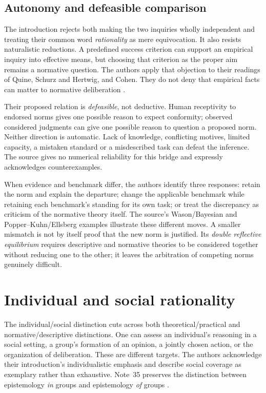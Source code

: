 \subsection{Autonomy and defeasible comparison}

The introduction rejects both making the two inquiries wholly
independent and treating their common word \emph{rationality} as
mere equivocation. It also resists naturalistic reductions. A predefined
success criterion can support an empirical inquiry into effective
means, but choosing that criterion as the proper aim remains a
normative question. The authors apply that objection to their readings
of Quine, Schurz and Hertwig, and Cohen. They do not deny that
empirical facts can matter to normative deliberation
\cite[pp.~24--26 and notes~28--33]{KnauffSpohn2021FrameworksIntro}.

Their proposed relation is \emph{defeasible}, not deductive. Human
receptivity to endorsed norms gives one possible reason to expect
conformity; observed considered judgments can give one possible reason
to question a proposed norm. Neither direction is automatic. Lack of
knowledge, conflicting motives, limited capacity, a mistaken standard
or a misdescribed task can defeat the inference. The source gives no
numerical reliability for this bridge and expressly acknowledges
counterexamples.

When evidence and benchmark differ, the authors identify three responses:
retain the norm and explain the departure; change the applicable
benchmark while retaining each benchmark's standing for its own task;
or treat the discrepancy as criticism of the normative theory itself.
The source's Wason/Bayesian and Popper--Kuhn/Ellsberg examples illustrate
these different moves. A smaller mismatch is not by itself proof that
the new norm is justified. Its \emph{double reflective equilibrium}
requires descriptive and normative theories to be considered together
without reducing one to the other; it leaves the arbitration of
competing norms genuinely difficult.

\section{Individual and social rationality}
\label{sec:p11-ri-individual-social}

The individual/social distinction cuts across both theoretical/practical
and normative/descriptive distinctions. One can assess an individual's
reasoning in a social setting, a group's formation of an opinion,
a jointly chosen action, or the organization of deliberation. These
are different targets. The authors acknowledge their introduction's
individualistic emphasis and describe social coverage as exemplary
rather than exhaustive. Note~35 preserves the distinction between
epistemology \emph{in} groups and epistemology \emph{of} groups
\cite[pp.~26--31 and notes~34--36]{KnauffSpohn2021FrameworksIntro}.

